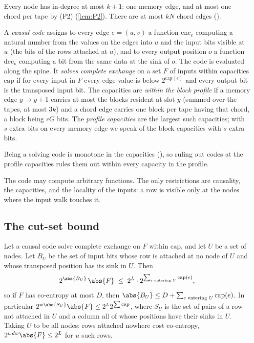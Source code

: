 Every node has in-degree at most $k+1$: one memory edge, and at most one chord per tape by (P2)
(\cref{lem:P2}). There are at most $kN$ chord edges ().

\begin{definition}\label{def:code}
A \emph{causal code} assigns to every edge $e=(u,v)$ a function $\mathrm{enc}_e$ computing a natural
number from the values on the edges into $u$ and the input bits visible at $u$ (the bits of the rows
attached at $u$), and to every output position $o$ a function $\mathrm{dec}_o$ computing a bit from
the same data at the sink of $o$. The code is evaluated along the spine. It \emph{solves complete
exchange} on a set $F$ of inputs within capacities $\mathrm{cap}$ if for every input in $F$ every edge
value is below $2^{\mathrm{cap}(e)}$ and every output bit is the transposed input bit. The capacities
are \emph{within the block profile} if a memory edge $y\to y+1$ carries at most the blocks resident at
slot $y$ (summed over the tapes, at most $3k$) and a chord edge carries one block per tape having that
chord, a block being $rG$ bits. The \emph{profile capacities} are the largest such capacities; with
$s$ extra bits on every memory edge we speak of the block capacities with $s$ extra bits.
\end{definition}

Being a solving code is monotone in the capacities (), so ruling out codes at the
profile capacities rules them out within every capacity in the profile.

The code may compute arbitrary functions. The only restrictions are causality, the capacities, and
the locality of the inputs: a row is visible only at the nodes where the input walk touches it.

\subsection{The cut-set bound}

\begin{lemma}\label{lem:cutset}
Let a causal code solve complete exchange on $F$ within $\mathrm{cap}$, and let $U$ be a set of
nodes. Let $B_U$ be the set of input bits whose row is attached at no node of $U$ and whose
transposed position has its sink in $U$. Then
\[
  2^{\abs{B_U}}\,\abs{F}\;\le\;2^{L}\cdot2^{\sum_{e\text{ entering }U}\mathrm{cap}(e)} ,
\]
so if $F$ has co-entropy at most $D$, then $\abs{B_U}\le D+\sum_{e\text{ entering }U}\mathrm{cap}(e)$.
In particular $2^{w\abs{S_U}}\abs{F}\le2^L2^{\sum\mathrm{cap}}$, where $S_U$ is the set of pairs of a row
not attached in $U$ and a column all of whose positions have their sinks in $U$. Taking $U$ to be all
nodes: rows attached nowhere cost co-entropy, $2^{u\,dw}\abs{F}\le2^L$ for $u$ such rows.
\end{lemma}

